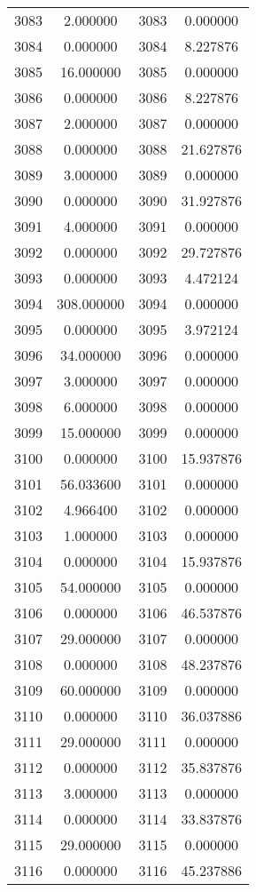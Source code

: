 \documentclass[12pt]{article}
\begin{document}
\begin{longtable}{@{}cccc@{}}
3083 & 2.000000 & 3083 & 0.000000 \\
3084 & 0.000000 & 3084 & 8.227876 \\
3085 & 16.000000 & 3085 & 0.000000 \\
3086 & 0.000000 & 3086 & 8.227876 \\
3087 & 2.000000 & 3087 & 0.000000 \\
3088 & 0.000000 & 3088 & 21.627876 \\
3089 & 3.000000 & 3089 & 0.000000 \\
3090 & 0.000000 & 3090 & 31.927876 \\
3091 & 4.000000 & 3091 & 0.000000 \\
3092 & 0.000000 & 3092 & 29.727876 \\
3093 & 0.000000 & 3093 & 4.472124 \\
3094 & 308.000000 & 3094 & 0.000000 \\
3095 & 0.000000 & 3095 & 3.972124 \\
3096 & 34.000000 & 3096 & 0.000000 \\
3097 & 3.000000 & 3097 & 0.000000 \\
3098 & 6.000000 & 3098 & 0.000000 \\
3099 & 15.000000 & 3099 & 0.000000 \\
3100 & 0.000000 & 3100 & 15.937876 \\
3101 & 56.033600 & 3101 & 0.000000 \\
3102 & 4.966400 & 3102 & 0.000000 \\
3103 & 1.000000 & 3103 & 0.000000 \\
3104 & 0.000000 & 3104 & 15.937876 \\
3105 & 54.000000 & 3105 & 0.000000 \\
3106 & 0.000000 & 3106 & 46.537876 \\
3107 & 29.000000 & 3107 & 0.000000 \\
3108 & 0.000000 & 3108 & 48.237876 \\
3109 & 60.000000 & 3109 & 0.000000 \\
3110 & 0.000000 & 3110 & 36.037886 \\
3111 & 29.000000 & 3111 & 0.000000 \\
3112 & 0.000000 & 3112 & 35.837876 \\
3113 & 3.000000 & 3113 & 0.000000 \\
3114 & 0.000000 & 3114 & 33.837876 \\
3115 & 29.000000 & 3115 & 0.000000 \\
3116 & 0.000000 & 3116 & 45.237886 \\

\end{longtable}
\end{document}
